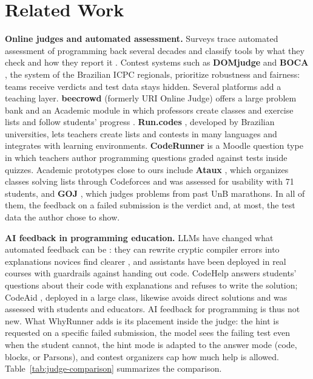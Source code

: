 \documentclass[12pt]{article}
\begin{document}
\section{Related Work}\label{sec:related}

\textbf{Online judges and automated assessment.} Surveys trace automated assessment of programming back several decades and classify tools by what they check and how they report it \cite{alamutka2005survey,ihantola2010review,wasik2018survey}. Contest systems such as \textbf{DOMjudge} \cite{domjudge2024} and \textbf{BOCA} \cite{de2004boca}, the system of the Brazilian ICPC regionals, prioritize robustness and fairness: teams receive verdicts and test data stays hidden. Several platforms add a teaching layer. \textbf{beecrowd} (formerly URI Online Judge) offers a large problem bank and an Academic module in which professors create classes and exercise lists and follow students' progress \cite{bez2014uri}. \textbf{Run.codes} \cite{runcodes2024}, developed by Brazilian universities, lets teachers create lists and contests in many languages and integrates with learning environments. \textbf{CodeRunner} \cite{lobb2016coderunner} is a Moodle question type in which teachers author programming questions graded against tests inside quizzes. Academic prototypes close to ours include \textbf{Ataux} \cite{silva2021ataux}, which organizes classes solving lists through Codeforces and was assessed for usability with 71 students, and \textbf{GOJ} \cite{lima2022gamma}, which judges problems from past UnB marathons. In all of them, the feedback on a failed submission is the verdict and, at most, the test data the author chose to show.

\textbf{AI feedback in programming education.} LLMs have changed what automated feedback can be \cite{denny2024computing}: they can rewrite cryptic compiler errors into explanations novices find clearer \cite{leinonen2023error}, and assistants have been deployed in real courses with guardrails against handing out code. CodeHelp \cite{liffiton2023codehelp} answers students' questions about their code with explanations and refuses to write the solution; CodeAid \cite{kazemitabaar2024codeaid}, deployed in a large class, likewise avoids direct solutions and was assessed with students and educators. AI feedback for programming is thus not new. What WhyRunner adds is its placement inside the judge: the hint is requested on a specific failed submission, the model sees the failing test even when the student cannot, the hint mode is adapted to the answer mode (code, blocks, or Parsons), and contest organizers cap how much help is allowed. Table~\ref{tab:judge-comparison} summarizes the comparison.
\end{document}
